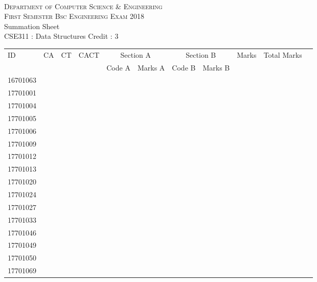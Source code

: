 \documentclass[12pt]{article}
\begin{document}
    \centering
    \begin{minipage}[m]{.8\textwidth} \centering 
	\smallskip
	\\
	\textsc{Department of Computer Science \& Engineering}\\
	\textsc{ First Semester Bsc Engineering Exam 2018}\\
    {\large {\sc Summation Sheet}}\\  
     {\centering CSE311 : Data Structures     Credit : 3 } \\
    \end{minipage} 
    \begin{center} 
	\renewcommand{\arraystretch}{1.08}
	\begin{small}
    \begin{tabular}{|l|c|c|c|c|c|c|c|c|c|c|} \hline
	\multirow{2}{*}{ID} & 	\multirow{2}{*}{CA}  & 	\multirow{2}{*}{CT}  & 	\multirow{2}{*}{CACT}  & \multicolumn{2 }{c|}{Section A}& \multicolumn{2 }{c|}{Section B} & 	\multirow{2}{*}{Marks}  & 	\multirow{2}{*}{Total Marks}  \\ 
	&  &  &  & Code A & Marks A & Code B & Marks B&  &  \\ \hline
16701063 &  &  &  &  &  &  &  &  & \\ \hline 
17701001 &  &  &  &  &  &  &  &  & \\ \hline 
17701004 &  &  &  &  &  &  &  &  & \\ \hline 
17701005 &  &  &  &  &  &  &  &  & \\ \hline 
17701006 &  &  &  &  &  &  &  &  & \\ \hline 
17701009 &  &  &  &  &  &  &  &  & \\ \hline 
17701012 &  &  &  &  &  &  &  &  & \\ \hline 
17701013 &  &  &  &  &  &  &  &  & \\ \hline 
17701020 &  &  &  &  &  &  &  &  & \\ \hline 
17701024 &  &  &  &  &  &  &  &  & \\ \hline 
17701027 &  &  &  &  &  &  &  &  & \\ \hline 
17701033 &  &  &  &  &  &  &  &  & \\ \hline 
17701046 &  &  &  &  &  &  &  &  & \\ \hline 
17701049 &  &  &  &  &  &  &  &  & \\ \hline 
17701050 &  &  &  &  &  &  &  &  & \\ \hline 
17701069 &  &  &  &  &  &  &  &  & \\ \hline 

\end{tabular}
\end{small}
\end{center}
\end{document}
